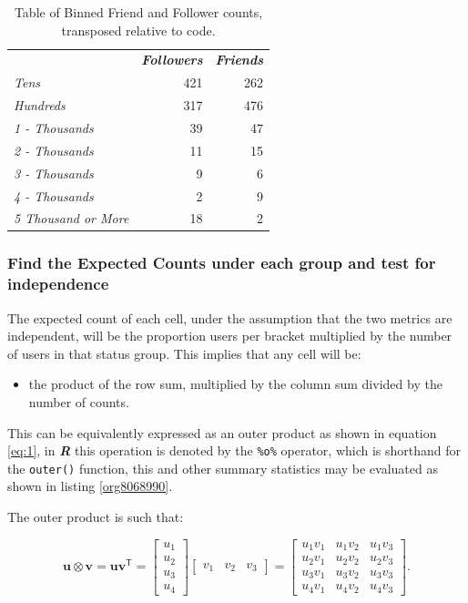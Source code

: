 \documentclass[11pt]{article}
\begin{document}
\begin{table}[htbp]
\caption{\label{tab:org6937b5c}Table of Binned Friend and Follower counts, transposed relative to code.}
\centering
\begin{tabular}{lrr}
 & \textbf{\textbf{\emph{Followers}}} & \textbf{\textbf{\emph{Friends}}}\\
\emph{Tens} & 421 & 262\\
\emph{Hundreds} & 317 & 476\\
\emph{1 - Thousands} & 39 & 47\\
\emph{2 - Thousands} & 11 & 15\\
\emph{3 - Thousands} & 9 & 6\\
\emph{4 - Thousands} & 2 & 9\\
\emph{5 Thousand or More} & 18 & 2\\
\end{tabular}
\end{table}

\subsubsection{Find the Expected Counts under each group and test for independence}
\label{sec:org2af3c28}
The expected count of each cell, under the assumption that the two metrics are
independent, will be the proportion users per bracket multiplied by the number
of users in that status group. This implies that any cell will be:

\begin{itemize}
\item the product of the row sum, multiplied by the column sum divided by the number of counts.
\end{itemize}

This can be equivalently expressed as an outer product as shown in equation
\eqref{eq:1}, in \textbf{\emph{R}} this operation is denoted by the \texttt{\%o\%} operator, which is
shorthand for the \texttt{outer()} function, this and other summary statistics may be
evaluated as shown in listing \ref{org8068990}.

The outer product is such that:


$$
\mathbf{u} \otimes \mathbf {v} =\mathbf {u} \mathbf {v} ^{\textsf {T}}={\begin{bmatrix}u_{1}\\u_{2}\\u_{3}\\u_{4}\end{bmatrix}}{\begin{bmatrix}v_{1}&v_{2}&v_{3}\end{bmatrix}}={\begin{bmatrix}u_{1}v_{1}&u_{1}v_{2}&u_{1}v_{3}\\u_{2}v_{1}&u_{2}v_{2}&u_{2}v_{3}\\u_{3}v_{1}&u_{3}v_{2}&u_{3}v_{3}\\u_{4}v_{1}&u_{4}v_{2}&u_{4}v_{3}\end{bmatrix}}.
$$
\end{document}
